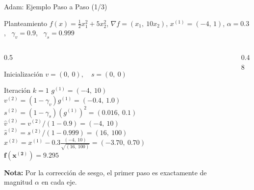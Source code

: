 \begin{frame}{Adam: Ejemplo Paso a Paso (1/3)}
    \begin{exampleblock}{Planteamiento}
        \scriptsize
        $f(x)=\tfrac12x_1^2+5x_2^2$, \quad $\nabla f=(x_1,\ 10x_2)$, \quad
        $x^{(1)}=(-4,\,1)$, \quad $\alpha=0.3$, \ $\gamma_v=0.9$, \ $\gamma_s=0.999$
    \end{exampleblock}

    \begin{columns}[T]
        \begin{column}{0.5\textwidth}
            \begin{block}{Inicialización}
                \scriptsize
                $v=(0,\ 0), \quad s=(0,\ 0)$
            \end{block}
            \begin{block}{Iteración $k=1$}
                \scriptsize
                $g^{(1)}=(-4,\ 10)$\\[2pt]
                $v^{(2)}=(1-\gamma_v)g^{(1)}=(-0.4,\ 1.0)$\\[2pt]
                $s^{(2)}=(1-\gamma_s)(g^{(1)})^2=(0.016,\ 0.1)$\\[2pt]
                $\hat{v}^{(2)}=v^{(2)}/(1-0.9)=(-4,\ 10)$\\[2pt]
                $\hat{s}^{(2)}=s^{(2)}/(1-0.999)=(16,\ 100)$\\[2pt]
                $x^{(2)}=x^{(1)} - 0.3 \frac{(-4,\ 10)}{\sqrt{(16,\ 100)}} = (-3.70,\ 0.70)$\\[2pt]
                $\mathbf{f(x^{(2)})=9.295}$
            \end{block}
            {\scriptsize \textbf{Nota:} Por la corrección de sesgo, el primer paso es exactamente de magnitud $\alpha$ en cada eje.\par}
        \end{column}
        \begin{column}{0.48\textwidth}
            \centering
        \end{column}
    \end{columns}
\end{frame}

